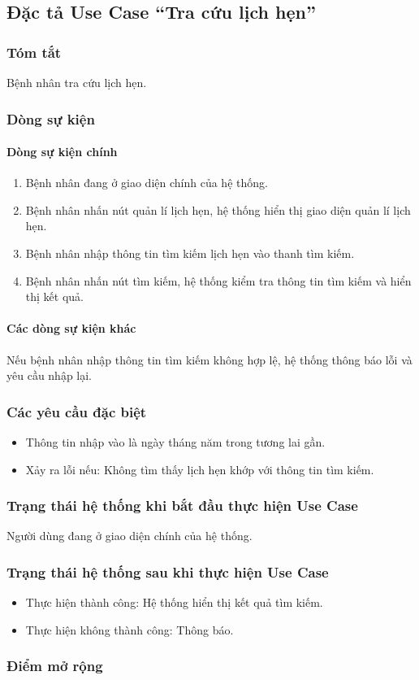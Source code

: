 \subsection{Đặc tả Use Case ``Tra cứu lịch hẹn''}

\subsubsection{Tóm tắt}
Bệnh nhân tra cứu lịch hẹn.

\subsubsection{Dòng sự kiện}
\paragraph{\textbf{Dòng sự kiện chính}}
\begin{enumerate}
  \item Bệnh nhân đang ở giao diện chính của hệ thống.
  \item Bệnh nhân nhấn nút quản lí lịch hẹn, hệ thống hiển thị giao diện quản lí lịch hẹn.
  \item Bệnh nhân nhập thông tin tìm kiếm lịch hẹn vào thanh tìm kiếm.
  \item Bệnh nhân nhấn nút tìm kiếm, hệ thống kiểm tra thông tin tìm kiếm và hiển thị kết quả.
\end{enumerate}

\paragraph{\textbf{Các dòng sự kiện khác}}
Nếu bệnh nhân nhập thông tin tìm kiếm không hợp lệ, hệ thống thông báo lỗi và yêu cầu nhập lại.

\subsubsection{Các yêu cầu đặc biệt}
\begin{itemize}
  \item Thông tin nhập vào là ngày tháng năm trong tương lai gần.
  \item Xảy ra lỗi nếu: Không tìm thấy lịch hẹn khớp với thông tin tìm kiếm.
\end{itemize}

\subsubsection{Trạng thái hệ thống khi bắt đầu thực hiện Use Case}
Người dùng đang ở giao diện chính của hệ thống.

\subsubsection{Trạng thái hệ thống sau khi thực hiện Use Case}
\begin{itemize}
  \item Thực hiện thành công: Hệ thống hiển thị kết quả tìm kiếm.
  \item Thực hiện không thành công: Thông báo.
\end{itemize}

\subsubsection{Điểm mở rộng}